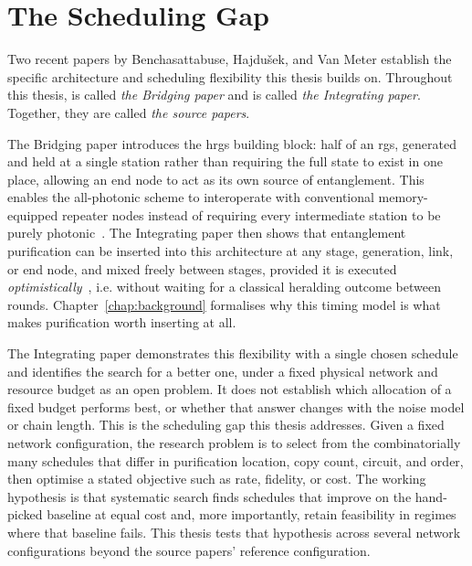 \section{The Scheduling Gap}
\label{sec:intro:gap}

Two recent papers by Benchasattabuse, Hajdušek, and Van Meter establish the specific architecture and scheduling flexibility this thesis builds on. Throughout this thesis, \cite{Benchasattabuse2026Bridging} is called \emph{the Bridging paper} and \cite{Benchasattabuse2025Integrating} is called \emph{the Integrating paper}. Together, they are called \emph{the source papers}.

The Bridging paper introduces the \Gls{hrgs} building block: half of an \Gls{rgs}, generated and held at a single station rather than requiring the full state to exist in one place, allowing an end node to act as its own source of entanglement. This enables the all-photonic scheme to interoperate with conventional memory-equipped repeater nodes instead of requiring every intermediate station to be purely photonic~\cite{Benchasattabuse2026Bridging}. The Integrating paper then shows that entanglement purification can be inserted into this architecture at any stage, generation, link, or end node, and mixed freely between stages, provided it is executed \emph{optimistically}~\cite{Benchasattabuse2025Integrating,Mobayenjarihani2023Optimistic}, i.e. without waiting for a classical heralding outcome between rounds. Chapter~\ref{chap:background} formalises why this timing model is what makes purification worth inserting at all.

The Integrating paper demonstrates this flexibility with a single chosen schedule and identifies the search for a better one, under a fixed physical network and resource budget as an open problem. It does not establish which allocation of a fixed budget performs best, or whether that answer changes with the noise model or chain length. This is the scheduling gap this thesis addresses. Given a fixed network configuration, the research problem is to select from the combinatorially many schedules that differ in purification location, copy count, circuit, and order, then optimise a stated objective such as rate, fidelity, or cost. The working hypothesis is that systematic search finds schedules that improve on the hand-picked baseline at equal cost and, more importantly, retain feasibility in regimes where that baseline fails. This thesis tests that hypothesis across several network configurations beyond the source papers' reference configuration.

